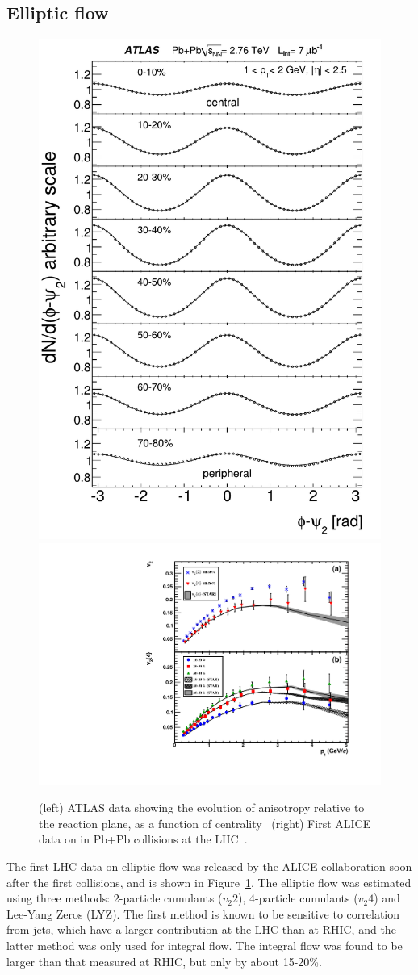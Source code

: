 \subsection{Elliptic flow}
\begin{figure}[!tb]
\begin{center}
\includegraphics[height=0.49\textwidth]{flowcorrelations_figs/atlas_v2_fig_02.pdf}
\includegraphics[height=0.49\textwidth]{flowcorrelations_figs/fig2.pdf}
\caption[]{(left) ATLAS data showing the evolution of anisotropy relative to the reaction plane, as a function of centrality~\cite{ATLAS:2011ah} (right) First ALICE data on \vtwo in Pb+Pb collisions at the LHC~\cite{Aamodt:2010pa}.}
\label{fig:pas:fc:firstresults}
\end{center}
\end{figure}
The first LHC data on elliptic flow was released by the ALICE collaboration soon after the first collisions, 
and is shown in Figure~\ref{fig:pas:fc:firstresults}.
The elliptic flow was estimated using three methods: 2-particle cumulants ($v_2{2}$), 4-particle cumulants ($v_2{4}$)
and Lee-Yang Zeros (LYZ).  The first method is known to be sensitive to correlation from jets, which have 
a larger contribution at the LHC than at RHIC, and the latter method was only used for integral flow.  
The integral flow was found to be larger than that measured at RHIC, but only by about 15-20\%.
